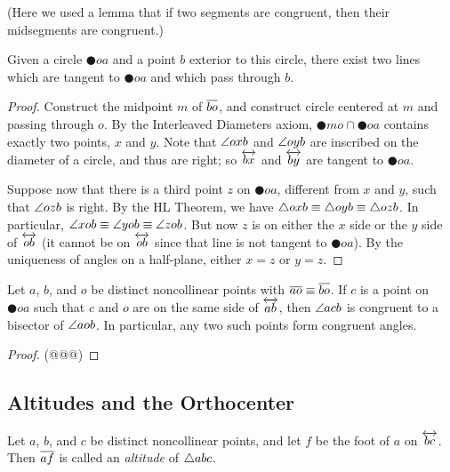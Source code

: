 (Here we used a lemma that if two segments are congruent, then their midsegments are congruent.)

\begin{construct}
Given a circle \(\CIRCLE{o}{a}\) and a point \(b\) exterior to this circle, there exist two lines which are tangent to \(\CIRCLE{o}{a}\) and which pass through \(b\).
\end{construct}

\begin{proof}
Construct the midpoint \(m\) of \(\overline{bo}\), and construct circle centered at \(m\) and passing through \(o\).
By the Interleaved Diameters axiom, \(\CIRCLE{m}{o} \cap \CIRCLE{o}{a}\) contains exactly two points, \(x\) and \(y\).
Note that \(\angle{oxb}\) and \(\angle{oyb}\) are inscribed on the diameter of a circle, and thus are right; so \(\overleftrightarrow{bx}\) and \(\overleftrightarrow{by}\) are tangent to \(\CIRCLE{o}{a}\).

Suppose now that there is a third point \(z\) on \(\CIRCLE{o}{a}\), different from \(x\) and \(y\), such that \(\angle{ozb}\) is right.
By the HL Theorem, we have \(\bigtriangleup{oxb} \equiv \bigtriangleup{oyb} \equiv \bigtriangleup{ozb}\).
In particular, \(\angle{xob} \equiv \angle{yob} \equiv \angle{zob}\).
But now \(z\) is on either the \(x\) side or the \(y\) side of \(\overleftrightarrow{ob}\) (it cannot be on \(\overleftrightarrow{ob}\) since that line is not tangent to \(\CIRCLE{o}{a}\)).
By the uniqueness of angles on a half-plane, either \(x = z\) or \(y = z\).
\end{proof}

\begin{prop}
Let \(a\), \(b\), and \(o\) be distinct noncollinear points with \(\overline{ao} \equiv \overline{bo}\).
If \(c\) is a point on \(\CIRCLE{o}{a}\) such that \(c\) and \(o\) are on the same side of \(\overleftrightarrow{ab}\), then \(\angle{acb}\) is congruent to a bisector of \(\angle{aob}\).
In particular, any two such points form congruent angles.
\end{prop}

\begin{proof}
(@@@)
\end{proof}

\subsection*{Altitudes and the Orthocenter}

\begin{dfn}
Let \(a\), \(b\), and \(c\) be distinct noncollinear points, and let \(f\) be the foot of \(a\) on \(\overleftrightarrow{bc}\).
Then \(\overline{af}\) is called an \emph{altitude} of \(\bigtriangleup{abc}\).
\end{dfn}

